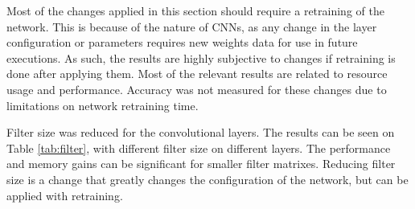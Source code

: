 \begin{enumerate}
Most of the changes applied in this section should require a retraining of the network. This is
because of the nature of CNNs, as any change in the layer configuration or parameters requires
new weights data for use in future executions. As such, the results are highly subjective to
changes if retraining is done after applying them. Most of the relevant results are related
to resource usage and performance. Accuracy was not measured for these changes due to
limitations on network retraining time.

Filter size was reduced for the convolutional layers. The results can be seen on Table \ref{tab:filter},
with different filter size on different layers. The performance and memory gains can be significant
for smaller filter matrixes.
Reducing filter size is a change that greatly changes the configuration of the network, but
can be applied with retraining.

\begin{table}[H]
    \begin{center}
        \caption{Execution time and resource usage for different configurations of filter size.}
            \label{tab:filter}
    \end{center}
\end{table}


\end{enumerate}
